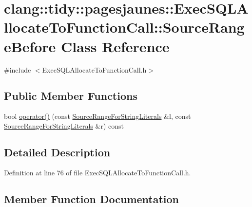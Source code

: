 \hypertarget{classclang_1_1tidy_1_1pagesjaunes_1_1_exec_s_q_l_allocate_to_function_call_1_1_source_range_before}{}\section{clang\+:\+:tidy\+:\+:pagesjaunes\+:\+:Exec\+S\+Q\+L\+Allocate\+To\+Function\+Call\+:\+:Source\+Range\+Before Class Reference}
\label{classclang_1_1tidy_1_1pagesjaunes_1_1_exec_s_q_l_allocate_to_function_call_1_1_source_range_before}


{\ttfamily \#include $<$Exec\+S\+Q\+L\+Allocate\+To\+Function\+Call.\+h$>$}

\subsection*{Public Member Functions}
\begin{DoxyCompactItemize}
\item 
bool \hyperlink{classclang_1_1tidy_1_1pagesjaunes_1_1_exec_s_q_l_allocate_to_function_call_1_1_source_range_before_a822aeb6c52b75ce756d0d314c2a9656f}{operator()} (const \hyperlink{classclang_1_1tidy_1_1pagesjaunes_1_1_exec_s_q_l_allocate_to_function_call_1_1_source_range_for_string_literals}{Source\+Range\+For\+String\+Literals} \&l, const \hyperlink{classclang_1_1tidy_1_1pagesjaunes_1_1_exec_s_q_l_allocate_to_function_call_1_1_source_range_for_string_literals}{Source\+Range\+For\+String\+Literals} \&r) const
\end{DoxyCompactItemize}


\subsection{Detailed Description}


Definition at line 76 of file Exec\+S\+Q\+L\+Allocate\+To\+Function\+Call.\+h.



\subsection{Member Function Documentation}
\mbox{\label{classclang_1_1tidy_1_1pagesjaunes_1_1_exec_s_q_l_allocate_to_function_call_1_1_source_range_before_a822aeb6c52b75ce756d0d314c2a9656f}} 
